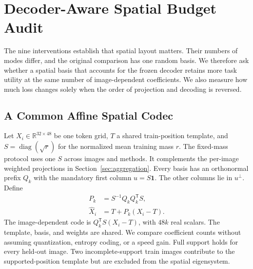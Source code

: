\section{Decoder-Aware Spatial Budget Audit}\label{sec:budget}
The nine interventions establish that spatial layout matters. Their numbers of modes differ, and the original comparison has one random basis. We therefore ask whether a spatial basis that accounts for the frozen decoder retains more task utility at the same number of image-dependent coefficients. We also measure how much loss changes solely when the order of projection and decoding is reversed.

\subsection{A Common Affine Spatial Codec}
Let $X_i\in\mathbb{R}^{32\times48}$ be one token grid, $T$ a shared train-position template, and $S=\operatorname{diag}(\sqrt{r})$ for the normalized mean training mass $r$. The fixed-mass protocol uses one $S$ across images and methods. It complements the per-image weighted projections in Section~\ref{sec:aggregation}. Every basis has an orthonormal prefix $Q_k$ with the mandatory first column $u=S\mathbf{1}$. The other columns lie in $u^\perp$. Define
\begin{align}
 P_k &= S^{-1}Q_kQ_k^\mathsf{T}S,\\
 \widehat X_i &= T+P_k(X_i-T).
\end{align}
The image-dependent code is $Q_k^\mathsf{T}S(X_i-T)$, with $48k$ real scalars. The template, basis, and weights are shared. We compare coefficient counts without assuming quantization, entropy coding, or a speed gain. Full support holds for every held-out image. Two incomplete-support train images contribute to the supported-position template but are excluded from the spatial eigensystem.


